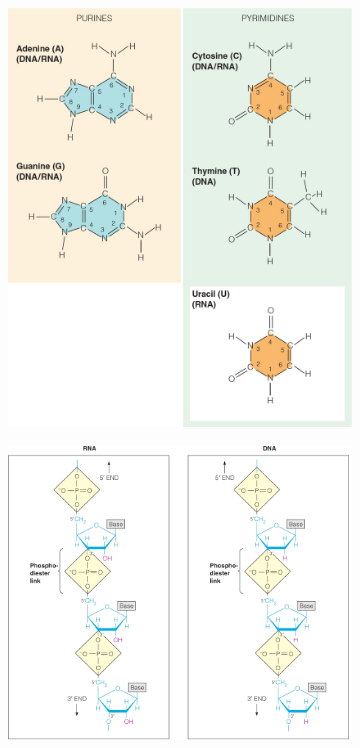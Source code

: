 \documentclass[]{article}
\begin{document}
\begin{figure}[H]
	\centering
	\caption{DNA/RNA much larger than proteins} \label{fig:NucleicAcidStructure} 
	\begin{subfigure}{.5\textwidth}
		\centering
		\includegraphics[width=.9\linewidth]{NucleicAcidStructure1}
	\end{subfigure}%
	\begin{subfigure}{.5\textwidth}
		\centering
		\includegraphics[width=.9\linewidth]{NucleicAcidStructure2}
	\end{subfigure}
\end{figure}
\end{document}
